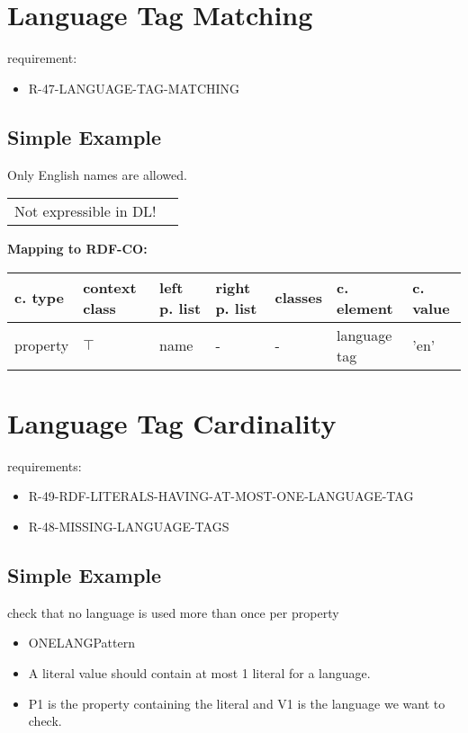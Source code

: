 \documentclass{llncs}
\newenvironment{gcotable}{
  \scriptsize
  \sffamily
  \vspace{0cm}
	\begin{center}
	\textbf{\vspace{0.4cm}Mapping to RDF-CO:} \\
  \begin{tabular}{l|l|l|l|l|l|l}
	\hline
  \textbf{c. type} & \textbf{context class} & \textbf{left p. list} & \textbf{right p. list} & \textbf{classes} & \textbf{c. element} & \textbf{c. value} \\
  \hline

}{
  \hline
  \end{tabular}
	\end{center}
}
\newenvironment{DL}{
  \vspace{0cm}
	\begin{center}
  \begin{tabular}{r l}

}{
  \end{tabular}
	\end{center}
}
\begin{document}
\section{Language Tag Matching}

requirement:

\begin{itemize}
	\item R-47-LANGUAGE-TAG-MATCHING
\end{itemize}

\subsection{Simple Example}

Only English names are allowed.

\begin{DL}
Not expressible in DL!
\end{DL}

\begin{gcotable}
property & $\top$ & name & - & - & language tag & 'en' \\
\end{gcotable}

\section{Language Tag Cardinality}

requirements:

\begin{itemize}
	\item R-49-RDF-LITERALS-HAVING-AT-MOST-ONE-LANGUAGE-TAG
	\item R-48-MISSING-LANGUAGE-TAGS
\end{itemize}

\subsection{Simple Example}

check that no language is used more than once per property


\begin{itemize}
	\item ONELANGPattern \cite{Kontokostas2014} 
  \item A literal value should contain at most 1 literal for a language. 
  \item P1 is the property containing the literal and V1 is the language we want to check.
\end{itemize}
\end{document}
